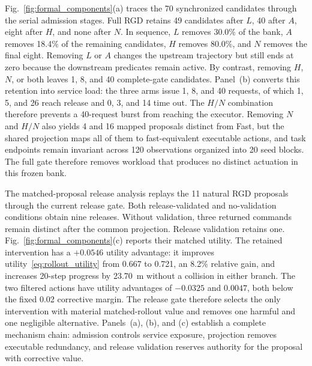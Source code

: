 \documentclass[letterpaper,journal]{IEEEtran}
\begin{document}
Fig.~\ref{fig:formal_components}(a) traces the 70 synchronized candidates
through the serial admission stages. Full RGD retains 49 candidates after
$L$, 40 after $A$, eight after $H$, and none after $N$. In sequence, $L$
removes 30.0\% of the bank, $A$ removes 18.4\% of the remaining candidates,
$H$ removes 80.0\%, and $N$ removes the final eight. Removing $L$ or $A$
changes the upstream trajectory but still ends at zero because the downstream
predicates remain active. By contrast, removing $H$, $N$, or both leaves 1,
8, and 40 complete-gate candidates. Panel~(b) converts this retention into
service load: the three arms issue 1, 8, and 40 requests, of which 1, 5, and
26 reach release and 0, 3, and 14 time out. The $H/N$ combination therefore
prevents a 40-request burst from reaching the executor. Removing $N$ and
$H/N$ also yields 4 and 16 mapped proposals distinct from Fast, but the shared
projection maps all of them to fast-equivalent executable actions, and task
endpoints remain invariant across 120 observations organized into 20
seed blocks. The
full gate therefore removes workload that produces no distinct actuation in this frozen
bank.

The matched-proposal release analysis replays the 11 natural RGD proposals
through the current release gate. Both release-validated and no-validation
conditions obtain nine releases. Without validation, three returned commands
remain distinct after the common projection. Release validation retains one.
Fig.~\ref{fig:formal_components}(c) reports their matched utility. The
retained intervention has a $+0.0546$ utility advantage: it improves
utility~\eqref{eq:rollout_utility} from 0.667 to 0.721, an 8.2\% relative
gain, and increases 20-step progress by
23.70~m without a collision in either branch. The two filtered actions have
utility advantages of $-0.0325$ and $0.0047$, both below the fixed 0.02
corrective margin. The release gate therefore selects the only intervention
with material matched-rollout value and removes one harmful and one negligible
alternative. Panels~(a), (b), and (c) establish a complete mechanism chain:
admission
controls service exposure, projection removes executable redundancy, and
release validation reserves authority for the proposal with corrective value.
\end{document}
